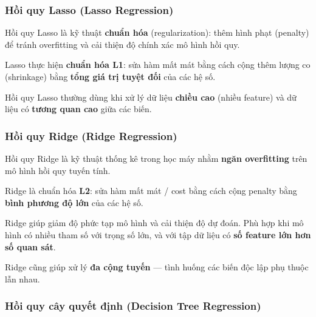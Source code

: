 \subsubsection{Hồi quy Lasso (Lasso Regression)}

\begin{dinhnghia}[title={Hồi quy Lasso}]
Hồi quy Lasso là kỹ thuật \textbf{chuẩn hóa} (regularization): thêm hình phạt (penalty) để tránh overfitting và cải thiện độ chính xác mô hình hồi quy.
\end{dinhnghia}

\begin{phuongphap}[title={L1 và trường hợp dùng}]
Lasso thực hiện \textbf{chuẩn hóa L1}: sửa hàm mất mát bằng cách cộng thêm lượng co (shrinkage) bằng \textbf{tổng giá trị tuyệt đối} của các hệ số.

Hồi quy Lasso thường dùng khi xử lý dữ liệu \textbf{chiều cao} (nhiều feature) và dữ liệu có \textbf{tương quan cao} giữa các biến.
\end{phuongphap}

\subsubsection{Hồi quy Ridge (Ridge Regression)}

\begin{dinhnghia}[title={Hồi quy Ridge}]
Hồi quy Ridge là kỹ thuật thống kê trong học máy nhằm \textbf{ngăn overfitting} trên mô hình hồi quy tuyến tính.
\end{dinhnghia}

\begin{phuongphap}[title={L2 và trường hợp dùng}]
Ridge là chuẩn hóa \textbf{L2}: sửa hàm mất mát / cost bằng cách cộng penalty bằng \textbf{bình phương độ lớn} của các hệ số.

Ridge giúp giảm độ phức tạp mô hình và cải thiện độ dự đoán.
Phù hợp khi mô hình có nhiều tham số với trọng số lớn, và với tập dữ liệu có \textbf{số feature lớn hơn số quan sát}.
\end{phuongphap}

\begin{luuy}[title={Đa cộng tuyến}]
Ridge cũng giúp xử lý \textbf{đa cộng tuyến} --- tình huống các biến độc lập phụ thuộc lẫn nhau.
\end{luuy}

\subsubsection{Hồi quy cây quyết định (Decision Tree Regression)}

